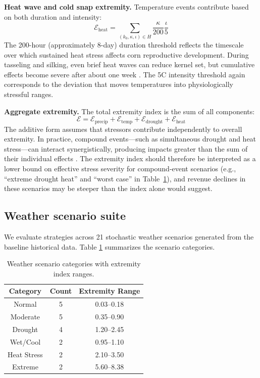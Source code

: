 \documentclass[pdflatex,sn-mathphys-num]{sn-jnl}
\newcommand{\df}[2]{\displaystyle\frac{#1}{#2}}
\begin{document}
\textbf{Heat wave and cold snap extremity.} Temperature events contribute based on both duration and intensity:
\begin{equation}
\mathcal{E}_{\text{heat}} = \sum_{(k_{0}, \kappa, \iota)\in H} \df{\kappa}{200}\df{\iota}{5}
\label{eqn:extreme-heatwave}
\end{equation}
The 200-hour (approximately 8-day) duration threshold reflects the timescale over which sustained heat stress affects corn reproductive development. During tasseling and silking, even brief heat waves can reduce kernel set, but cumulative effects become severe after about one week \cite{hatfield2015temperature}. The 5\textdegree C intensity threshold again corresponds to the deviation that moves temperatures into physiologically stressful ranges.

\textbf{Aggregate extremity.} The total extremity index is the sum of all components:
\begin{equation}
\mathcal{E} = \mathcal{E}_{\text{precip}} + \mathcal{E}_{\text{temp}} + \mathcal{E}_{\text{drought}} + \mathcal{E}_{\text{heat}}
\label{eqn:extremity}
\end{equation}
The additive form assumes that stressors contribute independently to overall extremity. In practice, compound events---such as simultaneous drought and heat stress---can interact synergistically, producing impacts greater than the sum of their individual effects \cite{zscheischler2018future}. The extremity index should therefore be interpreted as a lower bound on effective stress severity for compound-event scenarios (e.g., ``extreme drought heat'' and ``worst case'' in Table~\ref{tab:scenario-categories}), and revenue declines in these scenarios may be steeper than the index alone would suggest.

\subsection{Weather scenario suite}\label{subsec:weather-scenarios}

We evaluate strategies across 21 stochastic weather scenarios generated from the baseline historical data. Table \ref{tab:scenario-categories} summarizes the scenario categories.

\begin{table}[ht]
\centering
\begin{tabular}{|c|c|c|}
\hline
Category    & Count & Extremity Range \\
\hline\hline
Normal      & 5     & 0.03--0.18      \\
Moderate    & 5     & 0.35--0.90      \\
Drought     & 4     & 1.20--2.45      \\
Wet/Cool    & 2     & 0.95--1.10      \\
Heat Stress & 2     & 2.10--3.50      \\
Extreme     & 2     & 5.60--8.38      \\
\hline
\end{tabular}
\caption{Weather scenario categories with extremity index ranges.}
\label{tab:scenario-categories}
\end{table}
\end{document}
